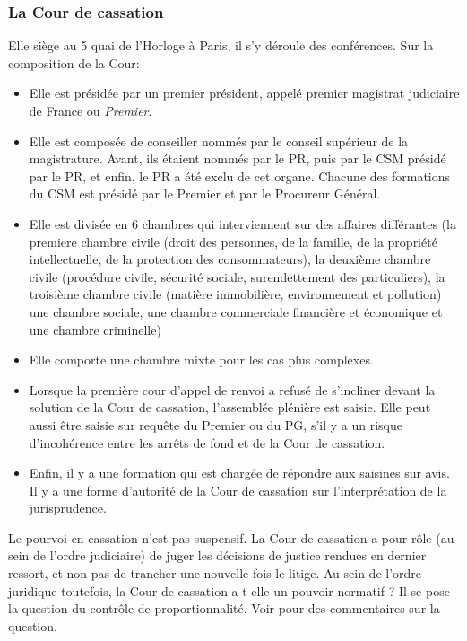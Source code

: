 \documentclass[math]{cours}
\begin{document}
\subsubsection{La Cour de cassation}
Elle siège au 5 quai de l'Horloge à Paris, il s'y déroule des conférences.
Sur la composition de la Cour:
\begin{itemize}
	\item Elle est présidée par un premier président, appelé premier magistrat judiciaire de France ou \emph{Premier}.
	\item Elle est composée de conseiller nommés par le conseil supérieur de la magistrature.
	      Avant, ils étaient nommés par le PR, puis par le CSM présidé par le PR, et enfin, le PR a été exclu de cet organe.
	      Chacune des formations du CSM est présidé par le Premier et par le Procureur Général.
	\item Elle est divisée en 6 chambres qui interviennent sur des affaires différantes (la premiere chambre civile (droit des personnes, de la famille, de la propriété intellectuelle, de la protection des consommateurs), la deuxième chambre civile (procédure civile, sécurité sociale, surendettement des particuliers), la troisième chambre civile (matière immobilière, environnement et pollution) une chambre sociale, une chambre commerciale financière et économique et une chambre criminelle)
	\item Elle comporte une chambre mixte pour les cas plus complexes.
	\item Lorsque la première cour d'appel de renvoi a refusé de s'incliner devant la solution de la Cour de cassation, l'assemblée plénière est saisie.
	      Elle peut aussi être saisie sur requête du Premier ou du PG, s'il y a un risque d'incohérence entre les arrêts de fond et de la Cour de cassation.
	\item Enfin, il y a une formation qui est chargée de répondre aux saisines sur avis.
	      Il y a une forme d'autorité de la Cour de cassation sur l'interprétation de la jurisprudence.
\end{itemize}
Le pourvoi en cassation n'est pas suspensif.
La Cour de cassation a pour rôle (au sein de l'ordre judiciaire) de juger les décisions de justice rendues en dernier ressort, et non pas de trancher une nouvelle fois le litige.
Au sein de l'ordre juridique toutefois, la Cour de cassation a-t-elle un pouvoir normatif ? Il se pose la question du contrôle de proportionnalité.
Voir \cite{Martens-Cass} pour des commentaires sur la question.
\end{document}
